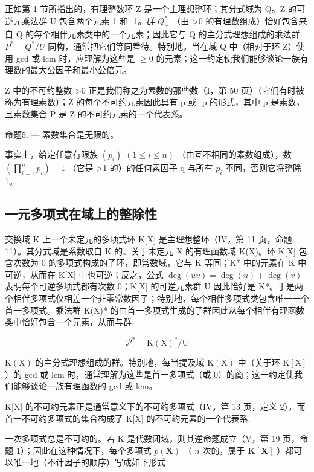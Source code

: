 正如第 1 节所指出的，有理整数环 Z 是一个主理想整环；其分式域为 Q。Z 的可逆元乘法群 U 包含两个元素 1 和 -1。群 \(Q_{+}^{*}\) （由 \textgreater0 的有理数组成）恰好包含来自 Q 的每个相伴元素类中的一个元素；因此它与 Q 的主分式理想组成的乘法群 \(P^{*} = Q^{*}/U\) 同构，通常把它们等同看待。特别地，当在域 Q 中（相对于环 Z）使用 gcd 或 lcm 时，应理解为这些是 \(\geqslant 0\) 的元素；这一约定使我们能够谈论一族有理数的最大公因子和最小公倍元。

Z 中的不可约整数 \textgreater0 正是我们称之为素数的那些数（I，第 50 页）（它们有时被称为有理素数）；Z 的每个不可约元素因此具有 p 或 -p 的形式，其中 p 是素数，且素数集合 P 是 Z 的不可约元素的一个代表系。

命题5. --- 素数集合是无限的。

事实上，给定任意有限族 \((p_{i})\) \((1 \leqslant i \leqslant n)\) （由互不相同的素数组成），数 \(\left(\prod_{i=1}^{n} p_{i}\right) + 1\) （它是 \textgreater1 的）的任何素因子 q 与所有 \(p_{i}\) 不同，否则它将整除 1。

\subsection{一元多项式在域上的整除性}

交换域 K 上一个未定元的多项式环 K{[}X{]} 是主理想整环（IV，第 11 页，命题 11）。其分式域是系数取自 K 的、关于未定元 X 的有理函数域 K(X)。环 K{[}X{]} 包含次数为 0 的多项式构成的子环，即常数域，它与 K 等同；K* 中的元素在 K 中可逆，从而在 K{[}X{]} 中也可逆；反之，公式 \(\deg(uv) = \deg(u) + \deg(v)\) 表明每个可逆多项式都有次数 0；K{[}X{]} 的可逆元素群 U 因此恰好是 K*。于是两个相伴多项式仅相差一个非零常数因子；特别地，每个相伴多项式类包含唯一一个首一多项式。乘法群 K(X)* 的由首一多项式生成的子群因此从每个相伴有理函数类中恰好包含一个元素，从而与群

\[
\mathcal {P} ^ {*} = \mathrm{K} (\mathrm{X}) ^ {*} / \mathrm{U}
\]

\(\mathrm{K}(\mathrm{X})\) 的主分式理想组成的群。特别地，每当提及域 \(\mathrm{K}(\mathrm{X})\) 中（关于环 \(\mathrm{K}[\mathrm{X}]\) ）的 gcd 或 lcm 时，通常理解为这些是首一多项式（或 0）的商；这一约定使我们能够谈论一族有理函数的 gcd 或 lcm。

K{[}X{]} 的不可约元素正是通常意义下的不可约多项式（IV，第 13 页，定义 2），而首一不可约多项式的集合构成了 K{[}X{]} 的不可约元素的一个代表系.

一次多项式总是不可约的。若 K 是代数闭域，则其逆命题成立（V，第 19 页，命题 1）；因此在这种情况下，每个多项式 \(p(\mathbf{X})\) （ \(n\) 次的，属于 \(\mathbf{K}[\mathbf{X}]\) ）都可以唯一地（不计因子的顺序）写成如下形式

